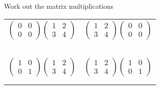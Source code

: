 \documentclass[fontsize=20pt]{scrartcl}
\begin{document}
\newpage
Work out the matrix multiplications
\newline
\newline
\begin{tabular}{p{13cm}p{13cm}}
$\begin{pmatrix}0&0\\0&0\end{pmatrix}\begin{pmatrix}1&2\\3&4\end{pmatrix}$
&$\begin{pmatrix}1&2\\3&4\end{pmatrix}\begin{pmatrix}0&0\\0&0\end{pmatrix}$
\\\\\\
\\\\\\

$\begin{pmatrix}1&0\\0&1\end{pmatrix}\begin{pmatrix}1&2\\3&4\end{pmatrix}$
&$\begin{pmatrix}1&2\\3&4\end{pmatrix}\begin{pmatrix}1&0\\0&1\end{pmatrix}$
\\\\\\

\end{tabular}
\end{document}
